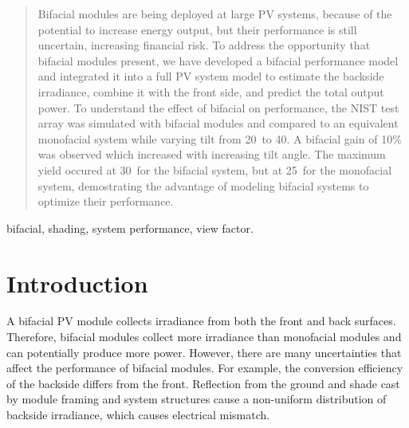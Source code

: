 \documentclass[conference]{IEEEtran}
\begin{document}
\begin{abstract}
Bifacial modules are being deployed at large PV systems, because of the potential to increase energy output, but their performance is still uncertain, increasing financial risk.  To address the opportunity that bifacial modules present, we have developed a bifacial performance model and integrated it into a full PV system model to estimate the backside irradiance, combine it with the front side, and predict the total output power.  To understand the effect of bifacial on performance, the NIST test array was simulated with bifacial modules and compared to an equivalent monofacial system while varying tilt from 20\degree\ to 40\degree.  A bifacial gain of 10\% was observed which increased with increasing tilt angle.  The maximum yield occured at 30\degree\ for the bifacial system, but at 25\degree\ for the monofacial system, demostrating the advantage of modeling bifacial systems to optimize their performance.
\end{abstract}
\begin{IEEEkeywords}
bifacial, shading, system performance, view factor.
\end{IEEEkeywords}




%
\IEEEpeerreviewmaketitle



\section{Introduction}
A bifacial PV module collects irradiance from both the front and back surfaces.  Therefore, bifacial modules collect more irradiance than monofacial modules and can potentially produce more power.  However, there are many uncertainties that affect the performance of bifacial modules.  For example, the conversion efficiency of the backside differs from the front.  Reflection from the ground and shade cast by module framing and system structures cause a non-uniform distribution of backside irradiance, which causes electrical mismatch.
\end{document}

